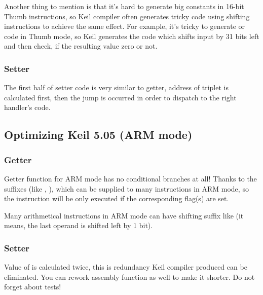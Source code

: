Another thing to mention is that it's hard to generate big constants in 16-bit Thumb instructions, so Keil compiler often generates
tricky code using shifting instructions to achieve the same effect.
For example, it's tricky to generate  or  code in Thumb mode, 
so Keil generates the code which shifts input  by 31 bits left and then check, if the resulting value zero or not.

\subsubsection{Setter}

The first half of setter code is very similar to getter, address of triplet is calculated first,
then the jump is occurred in order to dispatch to the right handler's code.



\subsection{Optimizing Keil 5.05 (ARM mode)}

\subsubsection{Getter}

Getter function for ARM mode has no conditional branches at all!
Thanks to the suffixes (like , ), which can be supplied to many instructions in ARM mode,
so the instruction will be only executed if the corresponding flag(s) are set.

Many arithmetical instructions in ARM mode can have shifting suffix like 
(it means, the last operand is shifted left by 1 bit).



\subsubsection{Setter}



Value of  is calculated twice, this is redundancy Keil compiler produced can be eliminated.
You can rework assembly function as well to make it shorter. Do not forget about tests!

